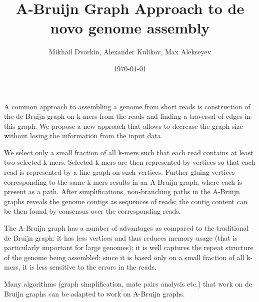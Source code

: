 \documentclass[12pt]{article}
\begin{document}
\author{Mikhail Dvorkin, Alexander Kulikov, Max Alekseyev}
\title{A-Bruijn Graph Approach to de novo genome assembly}
\date{\today}
\maketitle

A common approach to assembling a genome from short reads is construction of the de Bruijn graph on k-mers from the reads and finding a traversal of edges in this graph. We propose a new approach that allows to decrease the graph size without losing the information from the input data.

We select only a small fraction of all k-mers such that each read contains at least two selected k-mers. Selected k-mers are then represented by vertices so that each read is represented by a line graph on such vertices. Further gluing vertices corresponding to the same k-mers results in an A-Bruijn graph, where each is present as a path. After simplifications, non-branching paths in the A-Bruijn graphs reveals the genome contigs as sequences of reads; the contig content can be then found by consensus over the corresponding reads.

The A-Bruijn graph has a number of advantages as compared to the traditional de Bruijn graph: it has less vertices and thus reduces memory usage (that is particularly important for large genomes); it is well captures the repeat structure of the genome being assembled; since it is based only on a small fraction of all k-mers, it is less sensitive to the errors in the reads.

Many algorithms (graph simplification, mate pairs analysis etc.) that work on de Bruijn graphs can be adapted to work on A-Bruijn graphs.
\end{document}

